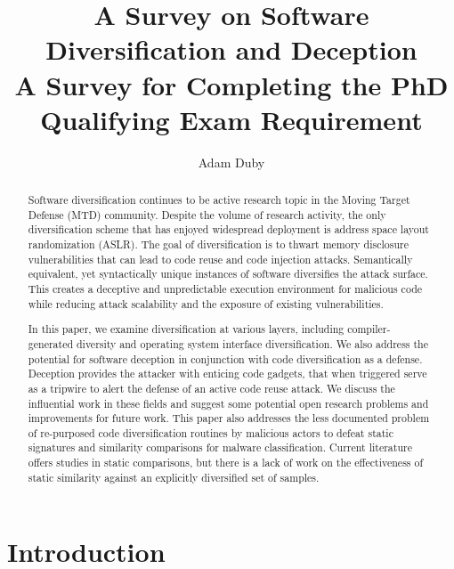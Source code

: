 \documentclass[preprint,12pt]{elsarticle}
\begin{document}
\begin{frontmatter}

\title{A Survey on Software Diversification and Deception\\\large A Survey for Completing the PhD Qualifying Exam Requirement}

\author{Adam Duby}
\address{Department of Computer Science\\University of Colorado Colorado Springs\\Colorado Springs, CO\\
}

\begin{abstract}
Software diversification continues to be active research topic in the Moving Target Defense (MTD) community. Despite the volume of research activity, the only diversification scheme that has enjoyed widespread deployment is address space layout randomization (ASLR). The goal of diversification is to thwart memory disclosure vulnerabilities that can lead to code reuse and code injection attacks. Semantically equivalent, yet syntactically unique instances of software diversifies the attack surface. This creates a deceptive and unpredictable execution environment for malicious code while reducing attack scalability and the exposure of existing vulnerabilities. 

In this paper, we examine diversification at various layers, including compiler-generated diversity and operating system interface diversification. We also address the potential for software deception in conjunction with code diversification as a defense. Deception provides the attacker with enticing code gadgets, that when triggered serve as a tripwire to alert the defense of an active code reuse attack. We discuss the influential work in these fields and suggest some potential open research problems and improvements for future work. This paper also addresses the less documented problem of re-purposed code diversification routines by malicious actors to defeat static signatures and similarity comparisons for malware classification. Current literature offers studies in static comparisons, but there is a lack of work on the effectiveness of static similarity against an explicitly diversified set of samples.
\end{abstract}
\end{frontmatter}

\section{Introduction}
\label{S:1}
\end{document}
